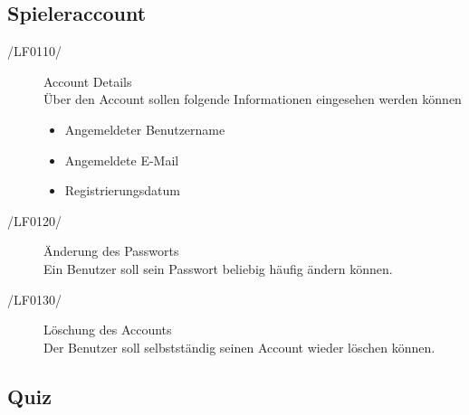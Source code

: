 \documentclass[11pt,a4paper]{scrreprt}
\begin{document}
\subsection{Spieleraccount}
\begin{description}
\item[/LF0110/] Account Details \\
Über den Account sollen folgende Informationen eingesehen werden können
	\begin{itemize}
	\item Angemeldeter Benutzername
	\item Angemeldete E-Mail
	\item Registrierungsdatum
	\end{itemize}
	
\item[/LF0120/] Änderung des Passworts \\
Ein Benutzer soll sein Passwort beliebig häufig ändern können.

\item[/LF0130/] Löschung des Accounts \\
Der Benutzer soll selbstständig seinen Account wieder löschen können.
\end{description}
\subsection{Quiz}
\end{document}
